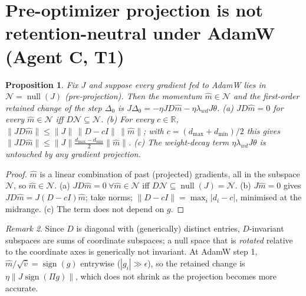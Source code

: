 \documentclass[11pt]{article}
\newtheorem{proposition}{Proposition}
\theoremstyle{remark}
\newtheorem{remark}[proposition]{Remark}
\begin{document}
\section{Pre-optimizer projection is not retention-neutral under AdamW (Agent C, T1)}
\begin{proposition}\label{p:pre}
Fix $J$ and suppose every gradient fed to AdamW lies in $\mathcal N=\operatorname{null}(J)$ (pre-projection). Then the
momentum $\hat m\in\mathcal N$ and the first-order retained change of the step $\Delta_0$ is
$J\Delta_0=-\eta JD\hat m-\eta\lambda_{wd}J\theta$. (a) $JD\hat m=0$ for every $\hat m\in\mathcal N$ iff
$D\mathcal N\subseteq\mathcal N$. (b) For every $c\in\mathbb{R}$, $\|JD\hat m\|\le\|J\|\,\|D-cI\|\,\|\hat m\|$; with
$c=(d_{\max}+d_{\min})/2$ this gives $\|JD\hat m\|\le\|J\|\frac{d_{\max}-d_{\min}}{2}\|\hat m\|$. (c) The weight-decay
term $\eta\lambda_{wd}J\theta$ is untouched by any gradient projection.
\end{proposition}
\begin{proof}
$\hat m$ is a linear combination of past (projected) gradients, all in the subspace $\mathcal N$, so $\hat m\in\mathcal N$.
(a) $JD\hat m=0\ \forall \hat m\in\mathcal N$ iff $D\mathcal N\subseteq\operatorname{null}(J)=\mathcal N$.
(b) $J\hat m=0$ gives $JD\hat m=J(D-cI)\hat m$; take norms; $\|D-cI\|=\max_i|d_i-c|$, minimised at the midrange.
(c) The term does not depend on $g$.
\end{proof}
\begin{remark} Since $D$ is diagonal with (generically) distinct entries, $D$-invariant subspaces are sums of coordinate
subspaces; a null space that is \emph{rotated} relative to the coordinate axes is generically not invariant. At AdamW step
1, $\hat m/\sqrt{\hat v}=\operatorname{sign}(g)$ entrywise ($|g_i|\gg\epsilon$), so the retained change is
$\eta\|J\operatorname{sign}(\Pi g)\|$, which does not shrink as the projection becomes more accurate. \end{remark}
\end{document}
